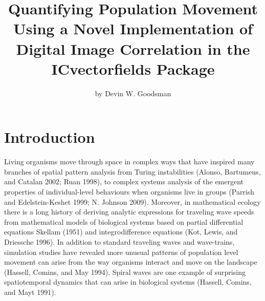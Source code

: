 \title{Quantifying Population Movement Using a Novel Implementation of Digital Image Correlation in the ICvectorfields Package}
\author{by Devin W. Goodsman}

\maketitle


\hypertarget{introduction}{%
\section{Introduction}\label{introduction}}

Living organisms move through space in complex ways that have inspired many branches of spatial pattern analysis from Turing instabilities (Alonso, Bartumeus, and Catalan 2002; Ruan 1998), to complex systems analysis of the emergent properties of individual-level behaviours when organisms live in groups (Parrish and Edelstein-Keshet 1999; N. Johnson 2009). Moreover, in mathematical ecology there is a long history of deriving analytic expressions for traveling wave speeds from mathematical models of biological systems based on partial differential equations Skellam (1951) and integrodifference equations (Kot, Lewis, and Driessche 1996). In addition to standard traveling waves and wave-trains, simulation studies have revealed more unusual patterns of population level movement can arise from the way organisms interact and move on the landscape (Hassell, Comins, and May 1994). Spiral waves are one example of surprising spatiotemporal dynamics that can arise in biological systems (Hassell, Comins, and Mayt 1991).

